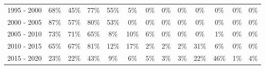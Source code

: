 \begin{table}[]
{\begin{tabular}{r|cccc|cccc|cccc}
            1995 - 2000           & \cellcolor[HTML]{FFC550}68\% & \cellcolor[HTML]{FFD88B}45\%     & \cellcolor[HTML]{FFBD39}77\%  & \cellcolor[HTML]{FFD072}55\% & \cellcolor[HTML]{FFFBF2}5\%  & 0\%                         & 0\%                         & 0\%                         & 0\%                          & 0\%                          & 0\%                         & 0\%                         \\
            2000 - 2005           & \cellcolor[HTML]{FFB520}87\% & \cellcolor[HTML]{FFCE6D}57\%     & \cellcolor[HTML]{FFBB32}80\%  & \cellcolor[HTML]{FFBB32}53\% & 0\%                          & 0\%                         & 0\%                         & 0\%                         & 0\%                          & 0\%                          & 0\%                         & 0\%                         \\
            2005 - 2010           & \cellcolor[HTML]{FFC144}73\% & \cellcolor[HTML]{FFC249}71\%     & \cellcolor[HTML]{FFC758}65\%  & \cellcolor[HTML]{FFC249}8\%  & \cellcolor[HTML]{FFF6E5}10\% & \cellcolor[HTML]{FFFAF0}6\% & 0\%                         & 0\%                         & 0\%                          & \cellcolor[HTML]{FFFEFC}1\%  & 0\%                         & 0\%                         \\
            2010 - 2015           & \cellcolor[HTML]{FFC758}65\% & \cellcolor[HTML]{FFC653}67\%     & \cellcolor[HTML]{FFBA2F}81\%  & \cellcolor[HTML]{FFF5E0}12\% & \cellcolor[HTML]{FFF5E0}17\% & \cellcolor[HTML]{FFFDFA}2\% & \cellcolor[HTML]{FFFDFA}2\% & \cellcolor[HTML]{FFFDFA}2\% & \cellcolor[HTML]{FFE4AF}31\% & \cellcolor[HTML]{FFFAF0}6\%  & 0\%                         & 0\%                         \\
            2015 - 2020           & \cellcolor[HTML]{FFEBC4}23\% & \cellcolor[HTML]{FFECC7}22\%     & \cellcolor[HTML]{FFDA91}43\%  & \cellcolor[HTML]{FFF7E8}9\%  & \cellcolor[HTML]{FFFAF0}6\%  & \cellcolor[HTML]{FFFBF2}5\% & \cellcolor[HTML]{FFFBF2}3\% & \cellcolor[HTML]{FFFBF2}3\% & \cellcolor[HTML]{FFECC7}22\% & \cellcolor[HTML]{FFD889}46\% & \cellcolor[HTML]{FFFEFC}1\% & \cellcolor[HTML]{FFFCF5}4\% \\ \hline
        \end{tabular}%
    }
\end{table}